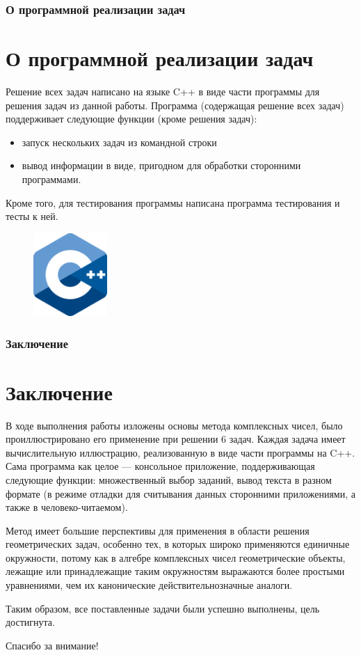 \documentclass{beamer}
\newcommand\frametitleSpec[1]{%
\frametitle{#1}
\section{#1}%
}
\begin{document}
\begin{frame}
   \frametitleSpec{О программной реализации задач}
   Решение всех задач написано на языке C++ в виде части программы для решения задач из данной работы.
   Программа (содержащая решение всех задач) поддерживает следующие функции (кроме решения задач):
   \begin{itemize}
      \item запуск нескольких задач из командной строки
      \item вывод информации в виде, пригодном для обработки сторонними программами.
   \end{itemize}
   Кроме того, для тестирования программы написана программа тестирования и тесты к ней.
   \begin{figure}[h]
      \centering
      \includegraphics[width=0.25\textwidth]{images/cpp-logo.png}
   \end{figure}
\end{frame}
\begin{frame}
   \frametitleSpec{Заключение}
   В ходе выполнения работы изложены основы метода комплексных чисел, было проиллюстрировано его
   применение при решении 6 задач. Каждая задача имеет вычислительную иллюстрацию,
   реализованную в виде части программы на C++. Сама программа как целое --- консольное приложение,
   поддерживающая следующие функции: множественный выбор заданий, вывод текста в разном формате (в режиме
   отладки для считывания данных сторонними приложениями, а также в человеко-читаемом).

   Метод имеет большие перспективы для применения в области решения геометрических
   задач, особенно тех, в которых широко применяются единичные окружности, потому как в алгебре
   комплексных чисел геометрические объекты, лежащие или принадлежащие таким окружностям выражаются
   более простыми уравнениями, чем их канонические действительнозначные аналоги.

   Таким образом, все поставленные задачи были успешно выполнены, цель
   достигнута.
\end{frame}
\begin{frame}
   \begin{center}
      {\huge Спасибо за внимание!}
   \end{center}
\end{frame}
\end{document}

